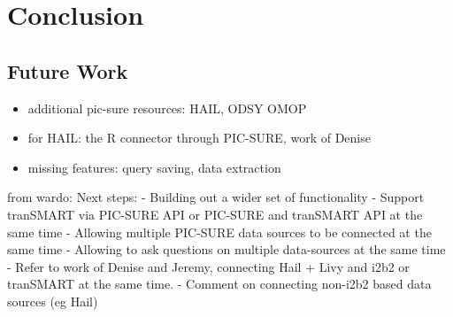 \chapter{Conclusion}

\section{Future Work}

\begin{itemize}
    \item additional pic-sure resources: HAIL, ODSY OMOP
    \item for HAIL: the R connector through PIC-SURE, work of Denise
    \item missing features: query saving, data extraction
\end{itemize}



from wardo:
Next steps:
- Building out a wider set of functionality
- Support tranSMART via PIC-SURE API or PIC-SURE and tranSMART API at the same time
- Allowing multiple PIC-SURE data sources to be connected at the same time
- Allowing to ask questions on multiple data-sources at the same time - Refer to work of Denise and Jeremy, connecting Hail + Livy and i2b2 or tranSMART at the same time.
- Comment on connecting non-i2b2 based data sources (eg Hail)
